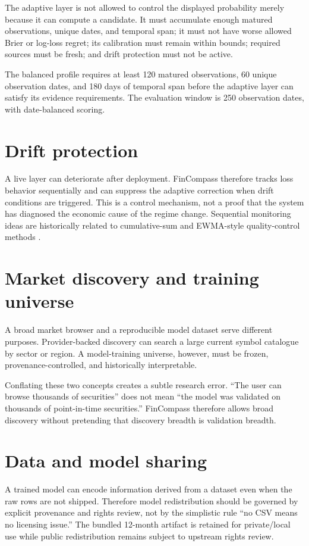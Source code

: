 \documentclass[11pt]{article}
\begin{document}
The adaptive layer is not allowed to control the displayed probability merely because it can compute a candidate. It must accumulate enough matured observations, unique dates, and temporal span; it must not have worse allowed Brier or log-loss regret; its calibration must remain within bounds; required sources must be fresh; and drift protection must not be active.

The balanced profile requires at least 120 matured observations, 60 unique observation dates, and 180 days of temporal span before the adaptive layer can satisfy its evidence requirements. The evaluation window is 250 observation dates, with date-balanced scoring.

\section{Drift protection}

A live layer can deteriorate after deployment. FinCompass therefore tracks loss behavior sequentially and can suppress the adaptive correction when drift conditions are triggered. This is a control mechanism, not a proof that the system has diagnosed the economic cause of the regime change. Sequential monitoring ideas are historically related to cumulative-sum and EWMA-style quality-control methods \citep{page1954continuous,roberts1959control}.

\section{Market discovery and training universe}

A broad market browser and a reproducible model dataset serve different purposes. Provider-backed discovery can search a large current symbol catalogue by sector or region. A model-training universe, however, must be frozen, provenance-controlled, and historically interpretable.

Conflating these two concepts creates a subtle research error. ``The user can browse thousands of securities'' does not mean ``the model was validated on thousands of point-in-time securities.'' FinCompass therefore allows broad discovery without pretending that discovery breadth is validation breadth.

\section{Data and model sharing}

A trained model can encode information derived from a dataset even when the raw rows are not shipped. Therefore model redistribution should be governed by explicit provenance and rights review, not by the simplistic rule ``no CSV means no licensing issue.'' The bundled 12-month artifact is retained for private/local use while public redistribution remains subject to upstream rights review.
\end{document}
